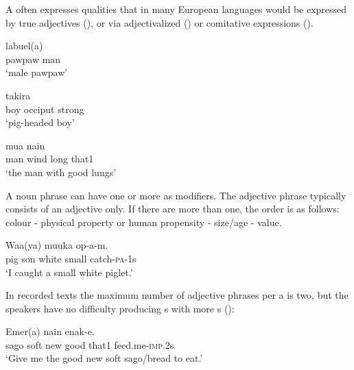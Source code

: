 A  often expresses qualities that in many European languages would be expressed by true adjectives (), or via adjectivalized () or comitative expressions ().

\ea%
\label{ex:x416}
\gll labuel(a)   \\
     pawpaw  man \\
\glt`male pawpaw'
\z





\ea%
\label{ex:x417}
\gll takira     \\
  boy  occiput  strong    \\
\glt`pig-headed boy'
\z





\ea%
\label{ex:x418}
\gll mua     nain  \\
   man  wind  long  that1   \\
\glt`the man with good lungs'
\z





A noun phrase can have one or more  as modifiers. The adjective phrase typically consists of an adjective only. If there are more  than one, the order is as follows: colour - physical property or human propensity - size/age - value.

\ea%
\label{ex:x419}
\gll Waa(ya)  muuka     op-a-m. \\
  pig  son  white  small  catch-\textsc{pa}-1s    \\
\glt`I caught  a small white piglet.'
\z





In recorded texts the maximum number of adjective phrases per a  is two, but the speakers have no difficulty producing s with more s ():

\ea%
\label{ex:x420}
\gll Emer(a)      nain  enak-e. \\
  sago  soft  new  good  that1  feed.me-\textsc{imp}.2s    \\
\glt`Give me the good new soft sago/bread to eat.'
\z





